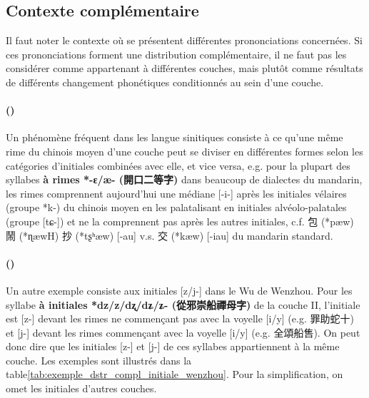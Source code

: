 \documentclass{scrbook}
\newcounter{c}[subsubsection]
\newcommand{\stpc}[1]{\stepcounter{#1}}
\newcommand{\difwenbai}{couches archaïque et récente\xspace}
\newcommand{\illustre}{Les exemples sont illustrés dans la table\xspace}
\newcommand{\termyyx}[1]{\textbf{#1}}
\begin{document}
\begin{sloppypar}

\subsection{Contexte complémentaire}
Il faut noter le contexte où se présentent différentes prononciations concernées. Si ces prononciations forment une distribution complémentaire, il ne faut pas les considérer comme appartenant à différentes couches, mais plutôt comme résultats de différents changement phonétiques conditionnés au sein d'une couche. 

\stpc{c}\paragraph{()}
Un phénomène fréquent dans les langue sinitiques consiste à ce qu'une même rime du chinois moyen d'une couche peut se diviser en différentes formes selon les catégories d'initiales combinées avec elle, et vice versa, e.g. pour la plupart des syllabes \termyyx{à rimes *-ɛ/æ- (開口二等字)} dans beaucoup de dialectes du mandarin, les rimes comprennent aujourd'hui une médiane [-i-] après les initiales vélaires (groupe *k-) du chinois moyen en les palatalisant en initiales alvéolo-palatales (groupe [tɕ-]) et ne la comprennent pas après les autres initiales, c.f. 包 (*pæw) 鬧 (*ɳæwH) 抄 (*tʂʰæw) [-au] v.s. 交 (*kæw) [-iau] du mandarin standard. 

\stpc{c}\paragraph{()}
Un autre exemple consiste aux initiales [z/j-] dans le Wu de Wenzhou. Pour les syllabe \termyyx{à initiales *dz/z/dʐ/dʑ/ʑ- (從邪崇船禪母字)} de la couche II, l'initiale est [z-] devant les rimes ne commençant pas avec la voyelle [i/y] (e.g. 罪助蛇十) et [j-] devant les rimes commençant avec la voyelle [i/y] (e.g. 全頌船售). On peut donc dire que les initiales [z-] et [j-] de ces syllabes appartiennent à la même couche. \illustre \ref{tab:exemple_dstr_compl_initiale_wenzhou}. Pour la simplification, on omet les initiales d'autres couches.


\end{sloppypar}
\end{document}
